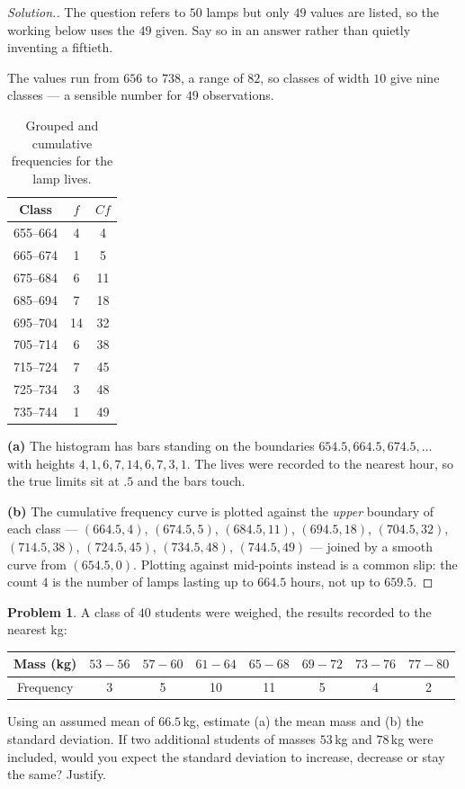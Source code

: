 \documentclass[11pt,a4paper]{article}
\theoremstyle{definition}
\newtheorem{problemx}{Problem}[section]
\newenvironment{problem}{\begin{problemx}}{\end{problemx}}
\newenvironment{solution}
  {\renewcommand{\qedsymbol}{}\begin{proof}[\textit{Solution}.]}
  {\end{proof}}
\begin{document}
\begin{solution}
The question refers to $50$ lamps but only $49$ values are listed, so the working below uses
the $49$ given. Say so in an answer rather than quietly inventing a fiftieth.

The values run from $656$ to $738$, a range of $82$, so classes of width $10$ give nine
classes --- a sensible number for $49$ observations.

\begin{table}[H]
\centering
\begin{tabular}{|c|c|c|}
\hline
Class & $f$ & $Cf$\\
\hline
655--664 & 4 & 4\\
665--674 & 1 & 5\\
675--684 & 6 & 11\\
685--694 & 7 & 18\\
695--704 & 14 & 32\\
705--714 & 6 & 38\\
715--724 & 7 & 45\\
725--734 & 3 & 48\\
735--744 & 1 & 49\\
\hline
\end{tabular}
\caption{Grouped and cumulative frequencies for the lamp lives.}
\end{table}

\textbf{(a)} The histogram has bars standing on the boundaries $654.5, 664.5, 674.5,\ldots$
with heights $4, 1, 6, 7, 14, 6, 7, 3, 1$. The lives were recorded to the nearest hour, so
the true limits sit at $.5$ and the bars touch.

\textbf{(b)} The cumulative frequency curve is plotted against the \emph{upper} boundary of
each class --- $(664.5, 4)$, $(674.5, 5)$, $(684.5, 11)$, $(694.5, 18)$, $(704.5, 32)$, $(714.5, 38)$, $(724.5, 45)$, $(734.5, 48)$, $(744.5, 49)$ --- joined by a smooth curve from $(654.5, 0)$.
Plotting against mid-points instead is a common slip: the count $4$ is the number of lamps
lasting up to $664.5$ hours, not up to $659.5$.
\end{solution}

\begin{problem}
A class of $40$ students were weighed, the results recorded to the nearest kg:
\begin{table}[H]
\centering
\begin{tabular}{|c|c|c|c|c|c|c|c|}
\hline
Mass (kg) & $53-56$ & $57-60$ & $61-64$ & $65-68$ & $69-72$ & $73-76$ & $77-80$\\
\hline
Frequency & 3 & 5 & 10 & 11 & 5 & 4 & 2\\
\hline
\end{tabular}
\end{table}
Using an assumed mean of $66.5$\,kg, estimate (a) the mean mass and (b) the standard
deviation. If two additional students of masses $53$\,kg and $78$\,kg were included, would
you expect the standard deviation to increase, decrease or stay the same? Justify.
\end{problem}
\end{document}
